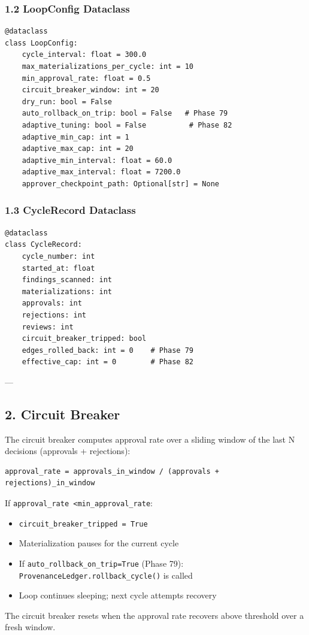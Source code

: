 \subsubsection{1.2 LoopConfig Dataclass}

\begin{lstlisting}
@dataclass
class LoopConfig:
    cycle_interval: float = 300.0
    max_materializations_per_cycle: int = 10
    min_approval_rate: float = 0.5
    circuit_breaker_window: int = 20
    dry_run: bool = False
    auto_rollback_on_trip: bool = False   # Phase 79
    adaptive_tuning: bool = False          # Phase 82
    adaptive_min_cap: int = 1
    adaptive_max_cap: int = 20
    adaptive_min_interval: float = 60.0
    adaptive_max_interval: float = 7200.0
    approver_checkpoint_path: Optional[str] = None
\end{lstlisting}

\subsubsection{1.3 CycleRecord Dataclass}

\begin{lstlisting}
@dataclass
class CycleRecord:
    cycle_number: int
    started_at: float
    findings_scanned: int
    materializations: int
    approvals: int
    rejections: int
    reviews: int
    circuit_breaker_tripped: bool
    edges_rolled_back: int = 0    # Phase 79
    effective_cap: int = 0        # Phase 82
\end{lstlisting}

---

\subsection{2. Circuit Breaker}

The circuit breaker computes approval rate over a sliding window of the last N decisions (approvals + rejections):

\begin{lstlisting}
approval_rate = approvals_in_window / (approvals + rejections)_in_window
\end{lstlisting}

If \texttt{approval\_rate \textless  min\_approval\_rate}:
\begin{itemize}
\item \texttt{circuit\_breaker\_tripped = True}
\item Materi\-alization pauses for the current cycle
\item If \texttt{auto\_rollback\_on\_trip=True} (Phase 79): \texttt{ProvenanceLedger.rollback\_cycle()} is called
\item Loop continues sleeping; next cycle attempts recovery

\end{itemize}
The circuit breaker resets when the approval rate recovers above threshold over a fresh window.

